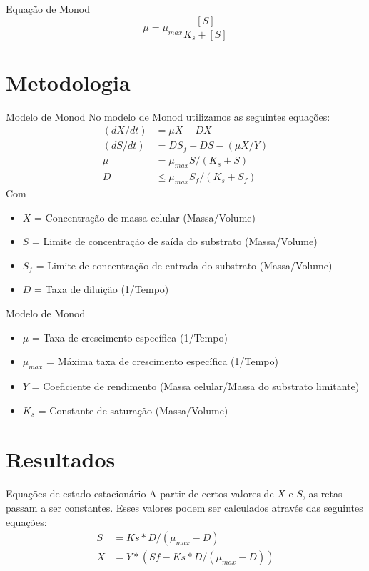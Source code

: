 \documentclass[10pt,xcolor=svgnames]{beamer} %
\begin{document}
\begin{frame}[standout]{Equação de Monod}
\begin{equation*}
    \mu = \mu_{max} \frac{[S]}{K_s + [S]}
\end{equation*}
\end{frame}

%

\section{Metodologia}
\begin{frame}{Modelo de Monod} %
No modelo de Monod utilizamos as seguintes equações:
\begin{align}
  (dX/dt) &= \mu X-DX \\
  (dS/dt) &= DS_f-DS-(\mu X/Y)\\
  \mu &= \mu_{max}S/(K_s+S)\\
  D &\leq \mu_{max}S_f/(K_s + S_f)
\end{align}
Com
\begin{itemize}
\item $X$ = Concentração de massa celular (Massa/Volume)
\item $S$ = Limite de concentração de saída do substrato (Massa/Volume)
\item $S_f$ = Limite de concentração de entrada do substrato (Massa/Volume)
\item $D$ = Taxa de diluição (1/Tempo)
\end{itemize}
\end{frame}

\begin{frame}{Modelo de Monod}
\begin{itemize}
    \item $\mu$ = Taxa de crescimento específica (1/Tempo)
    \item $\mu_{max}$ = Máxima taxa de crescimento específica (1/Tempo)
    \item $Y$ = Coeficiente de rendimento (Massa celular/Massa do substrato limitante)
    \item $K_s$ = Constante de saturação (Massa/Volume)
\end{itemize}

\end{frame}

\section{Resultados}
\begin{frame}{Equações de estado estacionário} %
A partir de certos valores de $X$ e $S$, as retas passam a ser constantes. Esses valores podem ser calculados através das seguintes equações:
\begin{align}
  S &= Ks*D/(\mu_{max}-D) \\
  X &= Y*(Sf- Ks*D/(\mu_{max}-D))
\end{align}
\end{frame}
\end{document}
